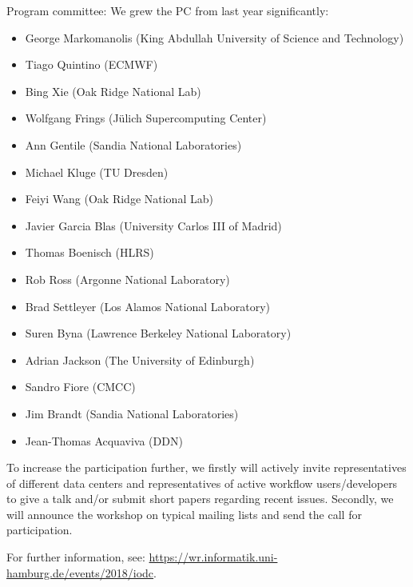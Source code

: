 \documentclass[a4paper,10pt]{article}
\begin{document}
Program committee:
We grew the PC from last year significantly:
\begin{itemize}
  \item George Markomanolis (King Abdullah University of Science and Technology)
  \item Tiago Quintino (ECMWF)
  \item Bing Xie (Oak Ridge National Lab)
  \item Wolfgang Frings (Jülich Supercomputing Center)
  \item Ann Gentile (Sandia National Laboratories)
  \item Michael Kluge (TU Dresden)
  \item Feiyi Wang (Oak Ridge National Lab)
  \item Javier Garcia Blas (University Carlos III of Madrid)
  \item Thomas Boenisch (HLRS)
  \item Rob Ross (Argonne National Laboratory)
  \item Brad Settleyer (Los Alamos National Laboratory)
  \item Suren Byna (Lawrence Berkeley National Laboratory)
  \item Adrian Jackson (The University of Edinburgh)
  \item Sandro Fiore (CMCC)
  \item Jim Brandt (Sandia National Laboratories)
  \item Jean-Thomas Acquaviva (DDN)
\end{itemize}

To increase the participation further, we firstly will actively invite representatives of different data centers and representatives of active workflow users/developers to give a talk and/or submit short papers regarding recent issues.
Secondly, we will announce the workshop on typical mailing lists and send the call for participation.


For further information, see: \url{https://wr.informatik.uni-hamburg.de/events/2018/iodc}.
\end{document}
